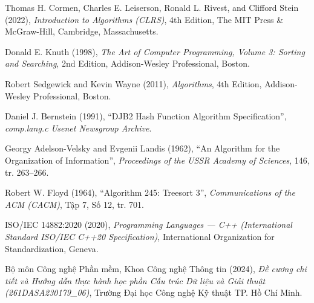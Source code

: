 \documentclass[14pt,a4paper]{extarticle}
\begin{document}
\begin{enumerate}[label={[\arabic*]}, leftmargin=*, itemsep=6pt, parsep=0pt, topsep=4pt]
    \item Thomas H. Cormen, Charles E. Leiserson, Ronald L. Rivest, and Clifford Stein (2022), \textit{Introduction to Algorithms (CLRS)}, 4th Edition, The MIT Press \& McGraw-Hill, Cambridge, Massachusetts.

    \item Donald E. Knuth (1998), \textit{The Art of Computer Programming, Volume 3: Sorting and Searching}, 2nd Edition, Addison-Wesley Professional, Boston.

    \item Robert Sedgewick and Kevin Wayne (2011), \textit{Algorithms}, 4th Edition, Addison-Wesley Professional, Boston.

    \item Daniel J. Bernstein (1991), ``DJB2 Hash Function Algorithm Specification'', \textit{comp.lang.c Usenet Newsgroup Archive}.

    \item Georgy Adelson-Velsky and Evgenii Landis (1962), ``An Algorithm for the Organization of Information'', \textit{Proceedings of the USSR Academy of Sciences}, 146, tr. 263--266.

    \item Robert W. Floyd (1964), ``Algorithm 245: Treesort 3'', \textit{Communications of the ACM (CACM)}, Tập 7, Số 12, tr. 701.

    \item ISO/IEC 14882:2020 (2020), \textit{Programming Languages --- C++ (International Standard ISO/IEC C++20 Specification)}, International Organization for Standardization, Geneva.

    \item Bộ môn Công nghệ Phần mềm, Khoa Công nghệ Thông tin (2024), \textit{Đề cương chi tiết và Hướng dẫn thực hành học phần Cấu trúc Dữ liệu và Giải thuật (261DASA230179\_06)}, Trường Đại học Công nghệ Kỹ thuật TP. Hồ Chí Minh.
\end{enumerate}
\end{document}
